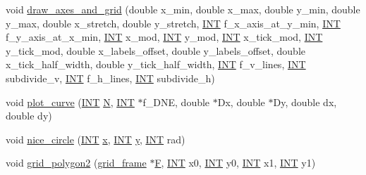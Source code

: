 \begin{DoxyCompactItemize}
void \mbox{\hyperlink{classmp__graphics_a50758b934912d486ff6e5fcbef74a1d0}{draw\+\_\+axes\+\_\+and\+\_\+grid}} (double x\+\_\+min, double x\+\_\+max, double y\+\_\+min, double y\+\_\+max, double x\+\_\+stretch, double y\+\_\+stretch, \mbox{\hyperlink{galois_8h_a09fddde158a3a20bd2dcadb609de11dc}{I\+NT}} f\+\_\+x\+\_\+axis\+\_\+at\+\_\+y\+\_\+min, \mbox{\hyperlink{galois_8h_a09fddde158a3a20bd2dcadb609de11dc}{I\+NT}} f\+\_\+y\+\_\+axis\+\_\+at\+\_\+x\+\_\+min, \mbox{\hyperlink{galois_8h_a09fddde158a3a20bd2dcadb609de11dc}{I\+NT}} x\+\_\+mod, \mbox{\hyperlink{galois_8h_a09fddde158a3a20bd2dcadb609de11dc}{I\+NT}} y\+\_\+mod, \mbox{\hyperlink{galois_8h_a09fddde158a3a20bd2dcadb609de11dc}{I\+NT}} x\+\_\+tick\+\_\+mod, \mbox{\hyperlink{galois_8h_a09fddde158a3a20bd2dcadb609de11dc}{I\+NT}} y\+\_\+tick\+\_\+mod, double x\+\_\+labels\+\_\+offset, double y\+\_\+labels\+\_\+offset, double x\+\_\+tick\+\_\+half\+\_\+width, double y\+\_\+tick\+\_\+half\+\_\+width, \mbox{\hyperlink{galois_8h_a09fddde158a3a20bd2dcadb609de11dc}{I\+NT}} f\+\_\+v\+\_\+lines, \mbox{\hyperlink{galois_8h_a09fddde158a3a20bd2dcadb609de11dc}{I\+NT}} subdivide\+\_\+v, \mbox{\hyperlink{galois_8h_a09fddde158a3a20bd2dcadb609de11dc}{I\+NT}} f\+\_\+h\+\_\+lines, \mbox{\hyperlink{galois_8h_a09fddde158a3a20bd2dcadb609de11dc}{I\+NT}} subdivide\+\_\+h)
\item 
void \mbox{\hyperlink{classmp__graphics_a2f288365e8ffc149570e25937e99003b}{plot\+\_\+curve}} (\mbox{\hyperlink{galois_8h_a09fddde158a3a20bd2dcadb609de11dc}{I\+NT}} \mbox{\hyperlink{_a_p_p_s_2_t_d_o_2packing_8_c_a0240ac851181b84ac374872dc5434ee4}{N}}, \mbox{\hyperlink{galois_8h_a09fddde158a3a20bd2dcadb609de11dc}{I\+NT}} $\ast$f\+\_\+\+D\+NE, double $\ast$Dx, double $\ast$Dy, double dx, double dy)
\item 
void \mbox{\hyperlink{classmp__graphics_a29055ee6a26b527757614c4e75911ade}{nice\+\_\+circle}} (\mbox{\hyperlink{galois_8h_a09fddde158a3a20bd2dcadb609de11dc}{I\+NT}} \mbox{\hyperlink{alphabet2_8_c_a6150e0515f7202e2fb518f7206ed97dc}{x}}, \mbox{\hyperlink{galois_8h_a09fddde158a3a20bd2dcadb609de11dc}{I\+NT}} \mbox{\hyperlink{alphabet2_8_c_a0a2f84ed7838f07779ae24c5a9086d33}{y}}, \mbox{\hyperlink{galois_8h_a09fddde158a3a20bd2dcadb609de11dc}{I\+NT}} rad)
\item 
void \mbox{\hyperlink{classmp__graphics_a2054989685b48955dc50472fe540684b}{grid\+\_\+polygon2}} (\mbox{\hyperlink{structgrid__frame}{grid\+\_\+frame}} $\ast$\mbox{\hyperlink{simeon_8_c_a21a61c535ff7d9d4b674461d3b19fffa}{F}}, \mbox{\hyperlink{galois_8h_a09fddde158a3a20bd2dcadb609de11dc}{I\+NT}} x0, \mbox{\hyperlink{galois_8h_a09fddde158a3a20bd2dcadb609de11dc}{I\+NT}} y0, \mbox{\hyperlink{galois_8h_a09fddde158a3a20bd2dcadb609de11dc}{I\+NT}} x1, \mbox{\hyperlink{galois_8h_a09fddde158a3a20bd2dcadb609de11dc}{I\+NT}} y1)

\end{DoxyCompactItemize}
